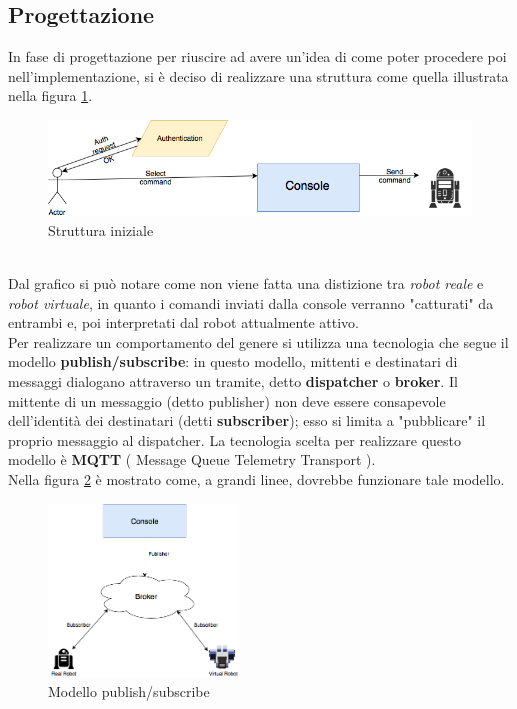 \documentclass{llncs}
\begin{document}
\subsection{Progettazione}
\label{ProgettazioneReq1}
In fase di progettazione per riuscire ad avere un'idea di come poter procedere poi nell'implementazione, si \`e deciso di realizzare una struttura come quella illustrata nella figura \hyperref[fig:RobotScheme]{\ref{fig:RobotScheme}}.\\
\begin{figure}
    \centering
    \includegraphics[width=1\textwidth]{Immagini/SchemaRobot.png}
    \caption{Struttura iniziale}
    \label{fig:RobotScheme}
\end{figure}
\vspace*{1ex}
\\
Dal grafico si pu\`o notare come non viene fatta una distizione tra \textit{robot reale} e \textit{robot virtuale}, in quanto i comandi inviati dalla console verranno "catturati" da entrambi e, poi interpretati dal robot attualmente attivo.\\
Per realizzare un comportamento del genere si utilizza una tecnologia che segue il modello \textbf{publish/subscribe}: in questo modello, mittenti e destinatari di messaggi dialogano attraverso un tramite, detto \textbf{dispatcher} o \textbf{broker}. Il mittente di un messaggio (detto publisher) non deve essere consapevole dell'identit\`a dei destinatari (detti \textbf{subscriber}); esso si limita a "pubblicare" il proprio messaggio al dispatcher. La tecnologia scelta per realizzare questo modello \`e \textbf{MQTT} ( Message Queue Telemetry Transport ).\\
Nella figura \hyperref[fig:pubsub]{\ref{fig:pubsub}} \`e mostrato come, a grandi linee, dovrebbe funzionare tale modello.
\begin{figure}
    \centering
    \includegraphics[width=0.45\textwidth]{Immagini/Mqtt.png}
    \caption{Modello publish/subscribe}
    \label{fig:pubsub}
\end{figure}
\pagebreak
\end{document}
